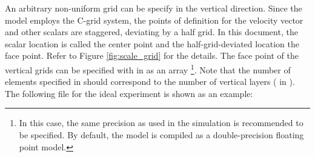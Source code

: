 An arbitrary non-uniform grid can be specify in the vertical direction.
Since the model employs the C-grid system, the points of definition for the velocity vector and other scalars are staggered, deviating by a half grid.
In this document, the scalar location is called the center point and the half-grid-deviated location the face point.
Refer to Figure \ref{fig:scale_grid} for the details.
The face point of the vertical grids can be specified with  in  as an array \footnote{In this case, the same precision as used in the simulation is recommended to be specified. By default, the model is compiled as a double-precision floating point model.}.
Note that the number of elements specified in  should correspond to the number of vertical layers ( in ).
The following file for the ideal experiment is shown as an example:

